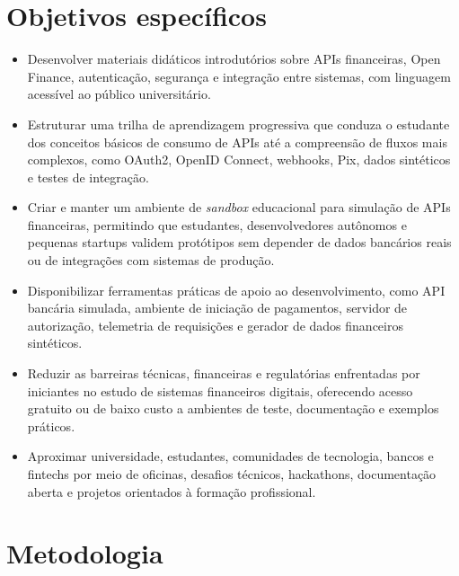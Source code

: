 \documentclass[
  12pt,
  openright,
  oneside,
  a4paper,
  brazilian
]{abntex2}
\begin{document}
\section{Objetivos específicos}

\begin{itemize}
  \item Desenvolver materiais didáticos introdutórios sobre APIs financeiras, Open Finance, autenticação, segurança e integração entre sistemas, com linguagem acessível ao público universitário.

  \item Estruturar uma trilha de aprendizagem progressiva que conduza o estudante dos conceitos básicos de consumo de APIs até a compreensão de fluxos mais complexos, como OAuth2, OpenID Connect, webhooks, Pix, dados sintéticos e testes de integração.

  \item Criar e manter um ambiente de \textit{sandbox} educacional para simulação de APIs financeiras, permitindo que estudantes, desenvolvedores autônomos e pequenas startups validem protótipos sem depender de dados bancários reais ou de integrações com sistemas de produção.

  \item Disponibilizar ferramentas práticas de apoio ao desenvolvimento, como API bancária simulada, ambiente de iniciação de pagamentos, servidor de autorização, telemetria de requisições e gerador de dados financeiros sintéticos.

  \item Reduzir as barreiras técnicas, financeiras e regulatórias enfrentadas por iniciantes no estudo de sistemas financeiros digitais, oferecendo acesso gratuito ou de baixo custo a ambientes de teste, documentação e exemplos práticos.

  \item Aproximar universidade, estudantes, comunidades de tecnologia, bancos e fintechs por meio de oficinas, desafios técnicos, hackathons, documentação aberta e projetos orientados à formação profissional.
\end{itemize}

\section{Metodologia}

\end{document}
